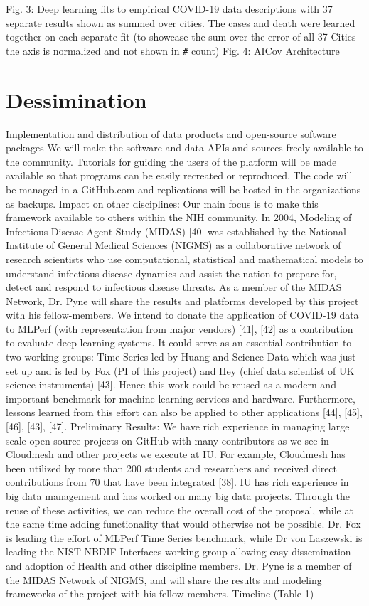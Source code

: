  
Fig. 3: Deep learning fits to empirical COVID-19 data descriptions with 37 separate results shown as summed over cities. The cases and death were learned together on each separate fit (to showcase the sum over the error of all 37 Cities the  axis is normalized and not shown in \verb|#| count) 	 
Fig. 4: AICov Architecture

\section{Dessimination}

Implementation and distribution of data products and open-source software packages 
We will make the software and data APIs and sources freely available to the community. Tutorials for guiding the users of the platform will be made available so that programs can be easily recreated or reproduced. The code will be managed in a GitHub.com and replications will be hosted in the organizations as backups. 
Impact on other disciplines: Our main focus is to make this framework available to others within the NIH community. In 2004, Modeling of Infectious Disease Agent Study (MIDAS) [40] was established by the National Institute of General Medical Sciences (NIGMS) as a collaborative network of research scientists who use computational, statistical and mathematical models to understand infectious disease dynamics and assist the nation to prepare for, detect and respond to infectious disease threats. As a member of the MIDAS Network, Dr. Pyne will share the results and platforms developed by this project with his fellow-members.
We intend to donate the application of COVID-19 data to MLPerf (with representation from major vendors) [41], [42] as a contribution to evaluate deep learning systems. It could serve as an essential contribution to two working groups: Time Series led by Huang and Science Data which was just set up and is led by Fox (PI of this project) and Hey (chief data scientist of UK science instruments) [43]. Hence this work could be reused as a modern and important benchmark for machine learning services and hardware. Furthermore, lessons learned from this effort can also be applied to other applications [44], [45], [46], [43], [47]. 
Preliminary Results: We have rich experience in managing large scale open source projects on GitHub with many contributors as we see in Cloudmesh and other projects we execute at IU. For example, Cloudmesh has been utilized by more than 200 students and researchers and received direct contributions from 70 that have been integrated [38]. IU has rich experience in big data management and has worked on many big data projects. Through the reuse of these activities, we can reduce the overall cost of the proposal, while at the same time adding functionality that would otherwise not be possible. Dr. Fox is leading the effort of MLPerf Time Series benchmark, while Dr von Laszewski is leading the NIST NBDIF Interfaces working group allowing easy dissemination and adoption of Health and other discipline members. Dr. Pyne is a member of the MIDAS Network of NIGMS, and will share the results and modeling frameworks of the project with his fellow-members.
Timeline (Table 1)

